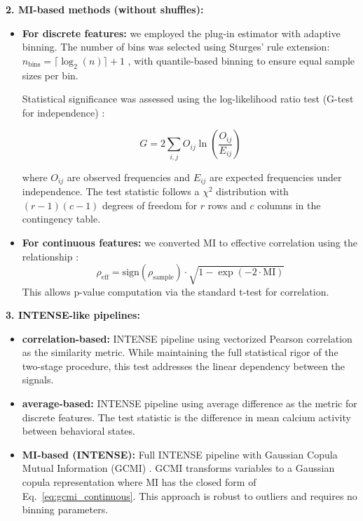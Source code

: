 \textbf{2. MI-based methods (without shuffles):}
\begin{itemize}
\item \textbf{For discrete features:} we employed the plug-in estimator with
adaptive binning. The number of bins was selected using Sturges' rule extension:
$n_{\text{bins}} = \lceil \log_2(n) \rceil + 1$ \citep{Sturges1926}, with
quantile-based binning to ensure equal sample sizes per bin.

Statistical significance was assessed using the log-likelihood ratio test (G-test
for independence) \citep{Sokal1995}:

\begin{equation}
\label{eq:gtest}
G = 2 \sum_{i,j} O_{ij} \ln\left(\frac{O_{ij}}{E_{ij}}\right)
\end{equation}

where $O_{ij}$ are observed frequencies and $E_{ij}$ are expected frequencies under
independence. The test statistic follows a $\chi^2$ distribution with $(r-1)(c-1)$
degrees of freedom for $r$ rows and $c$ columns in the contingency table.

\item \textbf{For continuous features:} we converted MI to effective correlation
using the relationship \citep{Cover2006}:
\begin{equation}
\label{eq:mi_to_corr}
\rho_{\text{eff}} = \text{sign}(\rho_{\text{sample}}) \cdot \sqrt{1 - \exp(-2 \cdot
\text{MI})}
\end{equation}
This allows p-value computation via the standard t-test for correlation.
\end{itemize}

\textbf{3. INTENSE-like pipelines:}
\begin{itemize}
\item \textbf{correlation-based:} INTENSE pipeline using vectorized Pearson
correlation as the similarity metric. While maintaining the full statistical rigor
of the two-stage procedure, this test addresses the linear dependency between the
signals.

\item \textbf{average-based:} INTENSE pipeline using average difference as the
metric for discrete features. The test statistic is the difference in mean calcium
activity between behavioral states.

\item \textbf{MI-based (INTENSE):} Full INTENSE pipeline with Gaussian Copula Mutual
Information (GCMI) \citep{gcmi}. GCMI transforms variables to a Gaussian copula
representation where MI has the closed form of Eq.~\ref{eq:gcmi_continuous}.
This approach is robust to outliers and requires no binning parameters.
\end{itemize}

